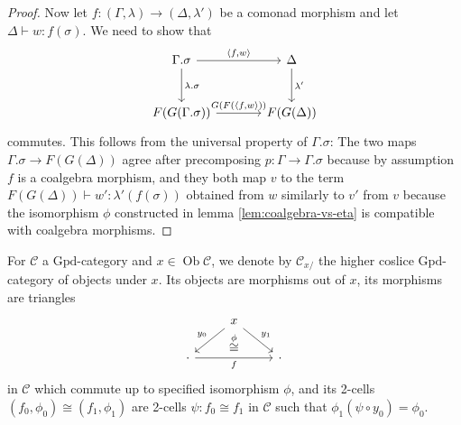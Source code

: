 \documentclass[a4paper]{article}
\theoremstyle{remark}
\theoremstyle{definition}
\begin{document}
\begin{proof}
  Now let $f : (\Gamma, \lambda) \rightarrow (\Delta, \lambda')$ be a comonad morphism and let $\Delta \vdash w : f(\sigma)$.
  We need to show that
  \begin{equation}
    \begin{tikzcd}[column sep=large, row sep=large]
      \Gamma.\sigma \arrow[r, "{\langle f, w \rangle}"] \arrow[d, "\lambda.\sigma"] & \Delta \arrow[d, "\lambda'"] \\
      F(G(\Gamma.\sigma)) \arrow[r, "{G(F(\langle f, w \rangle}))"] & F(G(\Delta))
    \end{tikzcd}
  \end{equation}
  commutes.
  This follows from the universal property of $\Gamma.\sigma$:
  The two maps $\Gamma.\sigma \rightarrow F(G(\Delta))$ agree after precomposing $p : \Gamma \rightarrow \Gamma.\sigma$ because by assumption $f$ is a coalgebra morphism, and they both map $v$ to the term $F(G(\Delta)) \vdash w' : \lambda'(f(\sigma))$ obtained from $w$ similarly to $v'$ from $v$ because the isomorphism $\phi$ constructed in lemma \ref{lem:coalgebra-vs-eta} is compatible with coalgebra morphisms.
\end{proof}

For $\mathcal{C}$ a $\mathrm{Gpd}$-category and $x \in \operatorname{Ob} \mathcal{C}$, we denote by $\mathcal{C}_{x / }$ the higher coslice $\mathrm{Gpd}$-category of objects under $x$.
Its objects are morphisms out of $x$, its morphisms are triangles
\begin{equation}
  \begin{tikzcd}
    & x \arrow[dl, "y_0"'] \arrow[dr, "y_1"] \arrow[d, "\overset{\phi}{\cong}", phantom] & \\
    \cdot \arrow[rr, "f"'] & \, & \cdot
  \end{tikzcd}
\end{equation}
in $\mathcal{C}$ which commute up to specified isomorphism $\phi$, and its 2-cells $(f_0, \phi_0) \cong (f_1, \phi_1)$ are 2-cells $\psi : f_0 \cong f_1$ in $\mathcal{C}$ such that $\phi_1 (\psi \circ y_0) = \phi_0$.
\end{document}
